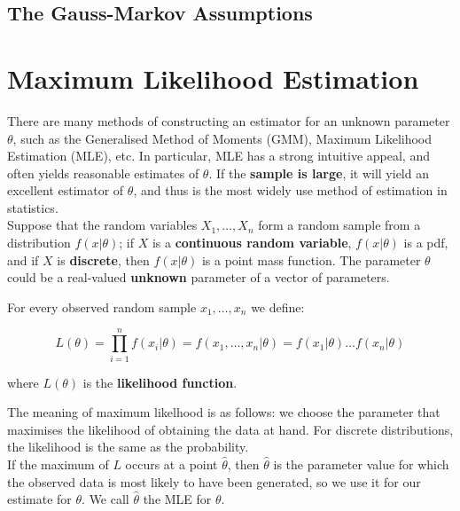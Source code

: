 \documentclass{article}
\begin{document}
\subsection{The Gauss-Markov Assumptions}



\section{Maximum Likelihood Estimation}
There are many methods of constructing an estimator for an unknown parameter $\theta$, such as the Generalised Method of Moments (GMM), Maximum Likelihood Estimation (MLE), etc. In particular, MLE has a strong intuitive appeal, and often yields reasonable estimates of $\theta$. If the \textbf{sample is large}, it will yield an excellent estimator of $\theta$, and thus is the most widely use method of estimation in statistics. \\

\noindent Suppose that the random variables $X_{1}, \dots , X_n$ form a random sample from a distribution $f(x\vert\theta)$; if $X$ is a \textbf{continuous random variable}, $f(x\vert\theta)$ is a pdf, and if $X$ is \textbf{discrete}, then $f(x\vert\theta)$ is a point mass function. The parameter $\theta$ could be a real-valued \textbf{unknown} parameter of a vector of parameters. \\

\begin{definition}
    For every observed random sample $x_{1}, \dots , x_n$ we define:

    \begin{equation}
        L(\theta) = \prod_{i=1}^{n}f(x_i \vert \theta) = f(x_{1}, \dots , x_n \vert \theta) = f(x_{1} \vert \theta) \dots f(x_n \vert \theta) 
    \end{equation}

    where $L(\theta)$ is the \textbf{likelihood function}. 
\end{definition}

\noindent The meaning of maximum likelhood is as follows: we choose the parameter that maximises the likelihood of obtaining the data at hand. For discrete distributions, the likelihood is the same as the probability. \\

\noindent If the maximum of $L$ occurs at a point $\hat{\theta}$, then $\hat{\theta}$ is the parameter value for which the observed data is most likely to have been generated, so we use it for our estimate for $\theta$. We call $\hat{\theta}$ the MLE for $\theta$. \\
\end{document}
